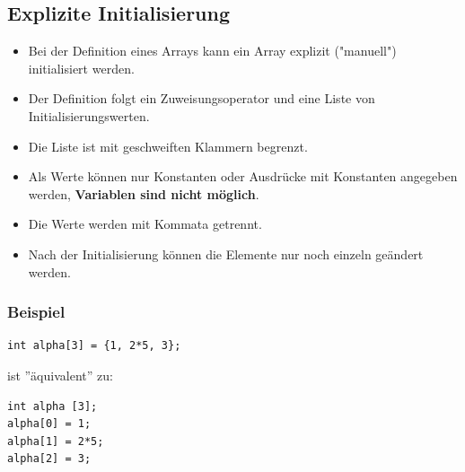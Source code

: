 \subsection{Explizite Initialisierung}
\begin{itemize}
	\item Bei der Definition eines Arrays kann ein Array explizit ("manuell") initialisiert werden.
	\item Der Definition folgt ein Zuweisungsoperator und eine Liste von Initialisierungswerten.
	\item Die Liste ist mit geschweiften Klammern begrenzt.
	\item Als Werte können nur Konstanten oder Ausdrücke mit Konstanten angegeben werden, \textbf{Variablen sind nicht möglich}.
	\item Die Werte werden mit Kommata getrennt.
	\item Nach der Initialisierung können die Elemente nur noch einzeln geändert werden.
\end{itemize}

\subsubsection{Beispiel}
\begin{minipage}{0.35\linewidth}
\begin{lstlisting}
int alpha[3] = {1, 2*5, 3};
\end{lstlisting}
\end{minipage}
\hspace{0.01\linewidth}
ist ''äquivalent'' zu:
\hspace{0.01\linewidth}
\noindent
\begin{minipage}{0.2\linewidth}
\begin{lstlisting}
int alpha [3];
alpha[0] = 1;
alpha[1] = 2*5;
alpha[2] = 3;
\end{lstlisting}
\end{minipage}


